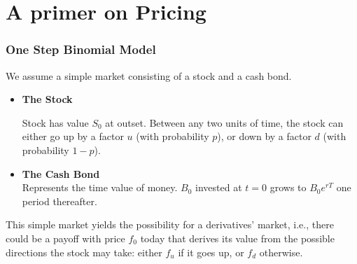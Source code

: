 \documentclass{beamer}
\begin{document}
\section{A primer on Pricing}
\begin{frame}
\frametitle{One Step Binomial Model}
We assume a simple market consisting of a stock and a cash bond.
\begin{itemize}
	\item<1->{\textbf{The Stock}\\
	\begin{figure}[h!]
\centering
{}
\end{figure}
Stock has value $S_0$ at outset. Between any two units of time, the stock can either go up by a factor $u$ (with probability $p$), or down by a factor $d$ (with probability $1-p$).
}
	\item<2>{\textbf{The Cash Bond}\\
	Represents the time value of money. $B_0$ invested at $t=0$ grows to $B_0e^{rT}$ one period thereafter.
	}
\end{itemize}
\end{frame}

\begin{frame}
	This simple market yields the possibility for a derivatives' market, i.e., there could be a payoff with price $f_0$ today that derives its value from the possible directions the stock may take: either $f_u$ if it goes up, or $f_d$ otherwise.
\begin{figure}
	
\end{figure}
\end{frame}
\end{document}
